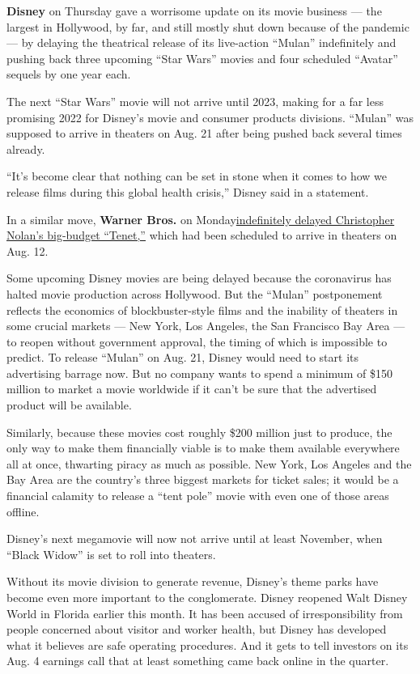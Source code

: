 \textbf{Disney} on Thursday gave a worrisome update on its movie
business --- the largest in Hollywood, by far, and still mostly shut
down because of the pandemic --- by delaying the theatrical release of
its live-action ``Mulan'' indefinitely and pushing back three upcoming
``Star Wars'' movies and four scheduled ``Avatar'' sequels by one year
each.

The next ``Star Wars'' movie will not arrive until 2023, making for a
far less promising 2022 for Disney's movie and consumer products
divisions. ``Mulan'' was supposed to arrive in theaters on Aug. 21 after
being pushed back several times already.

``It's become clear that nothing can be set in stone when it comes to
how we release films during this global health crisis,'' Disney said in
a statement.

In a similar move, \textbf{Warner Bros.} on
Monday\href{https://www.nytimes.com/live/2020/07/20/business/stock-market-today-coronavirus/warner-bros-backs-off-its-aug-12-release-date-for-tenet?partner=IFTTT}{indefinitely
delayed Christopher Nolan's big-budget ``Tenet,''} which had been
scheduled to arrive in theaters on Aug. 12.

Some upcoming Disney movies are being delayed because the coronavirus
has halted movie production across Hollywood. But the ``Mulan''
postponement reflects the economics of blockbuster-style films and the
inability of theaters in some crucial markets --- New York, Los Angeles,
the San Francisco Bay Area --- to reopen without government approval,
the timing of which is impossible to predict. To release ``Mulan'' on
Aug. 21, Disney would need to start its advertising barrage now. But no
company wants to spend a minimum of \$150 million to market a movie
worldwide if it can't be sure that the advertised product will be
available.

Similarly, because these movies cost roughly \$200 million just to
produce, the only way to make them financially viable is to make them
available everywhere all at once, thwarting piracy as much as possible.
New York, Los Angeles and the Bay Area are the country's three biggest
markets for ticket sales; it would be a financial calamity to release a
``tent pole'' movie with even one of those areas offline.

Disney's next megamovie will now not arrive until at least November,
when ``Black Widow'' is set to roll into theaters.

Without its movie division to generate revenue, Disney's theme parks
have become even more important to the conglomerate. Disney reopened
Walt Disney World in Florida earlier this month. It has been accused of
irresponsibility from people concerned about visitor and worker health,
but Disney has developed what it believes are safe operating procedures.
And it gets to tell investors on its Aug. 4 earnings call that at least
something came back online in the quarter.

